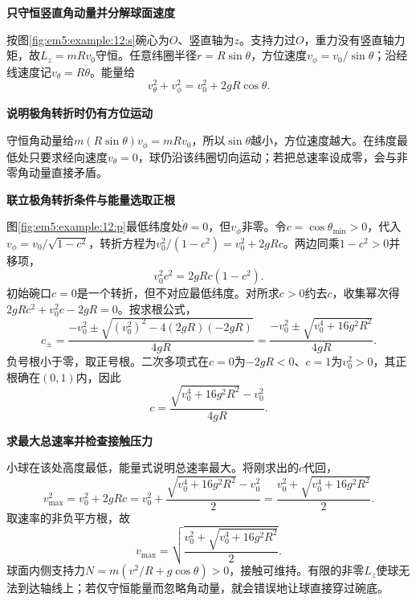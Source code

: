 \begin{solution}\textbf{只守恒竖直角动量并分解球面速度}\par\nobreak
按图\ref{fig:em5:example:12:s}碗心为$O$、竖直轴为$z$。支持力过$O$，重力没有竖直轴力矩，故$L_z=mRv_0$守恒。任意纬圈半径$r=R\sin\theta$，方位速度$v_\phi=v_0/\sin\theta$；沿经线速度记$v_\theta=R\dot\theta$。能量给
\[v_\theta^2+v_\phi^2=v_0^2+2gR\cos\theta.\]



\par\medskip{}\noindent\textbf{说明极角转折时仍有方位运动}\par\nobreak
守恒角动量给$m(R\sin\theta)v_\phi=mRv_0$，所以$\sin\theta$越小，方位速度越大。在纬度最低处只要求经向速度$v_\theta=0$，球仍沿该纬圈切向运动；若把总速率设成零，会与非零角动量直接矛盾。



\par\medskip{}\noindent\textbf{联立极角转折条件与能量选取正根}\par\nobreak
图\ref{fig:em5:example:12:p}最低纬度处$\dot\theta=0$，但$v_\phi$非零。令$c=\cos\theta_{\min}>0$，代入$v_\phi=v_0/\sqrt{1-c^2}$，转折方程为$v_0^2/(1-c^2)=v_0^2+2gRc$。两边同乘$1-c^2>0$并移项，
\[
v_0^2c^2=2gRc(1-c^2).
\]
初始碗口$c=0$是一个转折，但不对应最低纬度。对所求$c>0$约去$c$，收集幂次得$2gRc^2+v_0^2c-2gR=0$。按求根公式，
\[
c_\pm=\frac{-v_0^2\pm\sqrt{(v_0^2)^2-4(2gR)(-2gR)}}{4gR}
=\frac{-v_0^2\pm\sqrt{v_0^4+16g^2R^2}}{4gR}.
\]
负号根小于零，取正号根。二次多项式在$c=0$为$-2gR<0$、$c=1$为$v_0^2>0$，其正根确在$(0,1)$内，因此
\[\boxed{c=\frac{\sqrt{v_0^4+16g^2R^2}-v_0^2}{4gR}}.\]



\par\medskip{}\noindent\textbf{求最大总速率并检查接触压力}\par\nobreak
小球在该处高度最低，能量式说明总速率最大。将刚求出的$c$代回，
\[
v_{\max}^2=v_0^2+2gRc
=v_0^2+\frac{\sqrt{v_0^4+16g^2R^2}-v_0^2}{2}
=\frac{v_0^2+\sqrt{v_0^4+16g^2R^2}}2.
\]
取速率的非负平方根，故
\[\boxed{v_{\max}=\sqrt{\frac{v_0^2+\sqrt{v_0^4+16g^2R^2}}2}}.\]
球面内侧支持力$N=m(v^2/R+g\cos\theta)>0$，接触可维持。有限的非零$L_z$使球无法到达轴线上；若仅守恒能量而忽略角动量，就会错误地让球直接穿过碗底。\end{solution}
